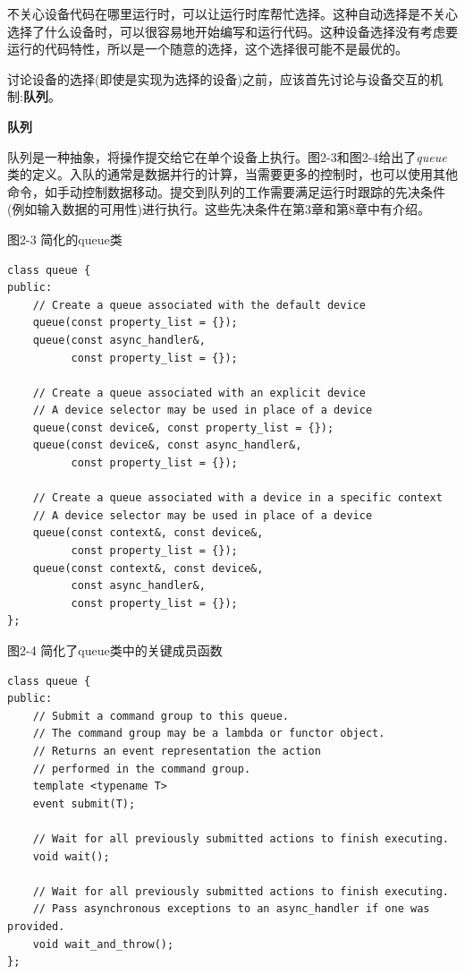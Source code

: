 
不关心设备代码在哪里运行时，可以让运行时库帮忙选择。这种自动选择是不关心选择了什么设备时，可以很容易地开始编写和运行代码。这种设备选择没有考虑要运行的代码特性，所以是一个随意的选择，这个选择很可能不是最优的。\par

讨论设备的选择(即使是实现为选择的设备)之前，应该首先讨论与设备交互的机制:\textbf{队列}。\par

\hspace*{\fill} \par %
\textbf{队列}

队列是一种抽象，将操作提交给它在单个设备上执行。图2-3和图2-4给出了\textit{queue}类的定义。入队的通常是数据并行的计算，当需要更多的控制时，也可以使用其他命令，如手动控制数据移动。提交到队列的工作需要满足运行时跟踪的先决条件(例如输入数据的可用性)进行执行。这些先决条件在第3章和第8章中有介绍。\par

\hspace*{\fill} \par %
图2-3 简化的queue类
\begin{lstlisting}[caption={}]
class queue {
public:
	// Create a queue associated with the default device
	queue(const property_list = {});
	queue(const async_handler&, 
		  const property_list = {});
	
	// Create a queue associated with an explicit device
	// A device selector may be used in place of a device
	queue(const device&, const property_list = {});
	queue(const device&, const async_handler&, 
	      const property_list = {});
	
	// Create a queue associated with a device in a specific context
	// A device selector may be used in place of a device
	queue(const context&, const device&, 
		  const property_list = {});
	queue(const context&, const device&, 
		  const async_handler&, 
		  const property_list = {});
};
\end{lstlisting}

\hspace*{\fill} \par %
图2-4 简化了queue类中的关键成员函数
\begin{lstlisting}[caption={}]
class queue {
public:
	// Submit a command group to this queue.
	// The command group may be a lambda or functor object.
	// Returns an event representation the action 
	// performed in the command group.
	template <typename T>
	event submit(T);
	
	// Wait for all previously submitted actions to finish executing.
	void wait();
	
	// Wait for all previously submitted actions to finish executing.
	// Pass asynchronous exceptions to an async_handler if one was provided.
	void wait_and_throw();
};
\end{lstlisting}	
	
